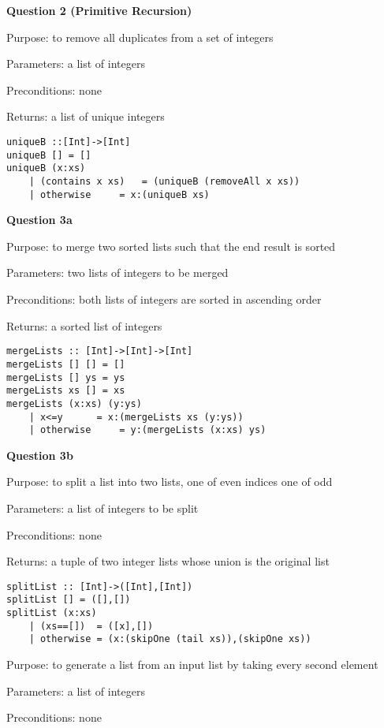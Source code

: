 \documentclass{article}
\begin{document}
\textbf{Question 2 (Primitive Recursion)}

Purpose: to remove all duplicates from a set of integers

Parameters: a list of integers

Preconditions: none

Returns: a list of unique integers

\begin{lstlisting}
uniqueB ::[Int]->[Int]
uniqueB [] = []
uniqueB (x:xs)
    | (contains x xs)	= (uniqueB (removeAll x xs))
    | otherwise		= x:(uniqueB xs)
\end{lstlisting}
    
\textbf{Question 3a}

Purpose: to merge two sorted lists such that the end result is sorted

Parameters: two lists of integers to be merged

Preconditions: both lists of integers are sorted in ascending order

Returns: a sorted list of integers

\begin{lstlisting}
mergeLists :: [Int]->[Int]->[Int]
mergeLists [] [] = []
mergeLists [] ys = ys
mergeLists xs [] = xs
mergeLists (x:xs) (y:ys)
    | x<=y		= x:(mergeLists xs (y:ys))
    | otherwise		= y:(mergeLists (x:xs) ys)
\end{lstlisting}
    
\newpage

\pagestyle{myheadings}

\textbf{Question 3b}

Purpose: to split a list into two lists, one of even indices one of odd

Parameters: a list of integers to be split

Preconditions: none

Returns: a tuple of two integer lists whose union is the original list

\begin{lstlisting}
splitList :: [Int]->([Int],[Int])
splitList [] = ([],[])
splitList (x:xs)
    | (xs==[])	= ([x],[])
    | otherwise	= (x:(skipOne (tail xs)),(skipOne xs))
\end{lstlisting}

Purpose: to generate a list from an input list by taking every second element

Parameters: a list of integers

Preconditions: none
\end{document}
